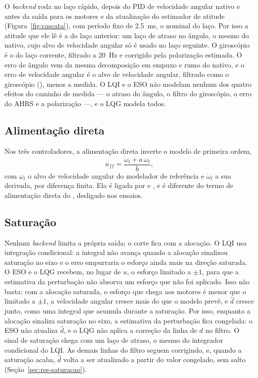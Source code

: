 O \textit{backend} roda no laço rápido,
depois do PID de velocidade angular nativo e antes da saída para os motores e
da atualização do estimador de atitude (Figura~\ref{fig:cascata}), com
período fixo de \SI{2.5}{\milli\second}, o nominal do laço. Por isso a
atitude que ele lê é a do laço anterior: um laço de atraso no ângulo, o mesmo
do nativo, cujo alvo de velocidade angular só é usado no laço seguinte. O
giroscópio é o do laço corrente, filtrado a \SI{20}{\hertz} e corrigido pela
polarização estimada. O erro de ângulo vem da mesma decomposição em empuxo e
rumo do nativo, e o erro de velocidade angular é o alvo de velocidade angular,
filtrado como o giroscópio (), menos a medida. O LQI e o ESO
não modelam nenhum dos quatro efeitos do caminho de medida --- o atraso do
ângulo, o filtro do giroscópio, o erro do AHRS e a polarização ---, e o LQG
modela todos.

\subsection{Alimentação direta}

Nos três controladores, a alimentação direta
inverte o modelo de primeira ordem,
\begin{equation}
u_{ff} = \frac{\dot\omega_t + a\,\omega_t}{b},
\label{eq:ff-modelo}
\end{equation}
com $\omega_t$ o alvo de velocidade angular do modelador de referência e
$\dot\omega_t$ a sua derivada, por diferença finita. Ela é ligada por  e
, e é diferente do termo de alimentação direta do
, desligado nos ensaios.

\subsection{Saturação}

Nenhum \textit{backend} limita a própria saída; o corte
fica com a alocação. O LQI usa integração condicional: a integral não avança
quando a alocação sinalizou saturação no eixo e o erro empurraria o esforço
ainda mais na direção saturada. O ESO e o LQG recebem, no lugar de $u$, o
esforço limitado a $\pm1$, para que a estimativa da perturbação não absorva
um esforço que não foi aplicado. Isso não basta: com a alocação saturada, o
esforço que chega aos motores é menor que o limitado a $\pm1$, a velocidade
angular cresce mais do que o modelo prevê, e $\hat d$ cresce junto, como uma
integral que acumula durante a saturação. Por isso, enquanto a alocação
sinaliza saturação no eixo, a estimativa da perturbação fica congelada: o ESO
não atualiza $\hat d$, e o LQG não aplica a correção da linha de $d$ no
filtro. O sinal de saturação chega com um laço de atraso, o mesmo do
integrador condicional do LQI. As demais linhas do filtro seguem corrigindo,
e, quando a saturação acaba, $\hat d$ volta a ser atualizado a partir do
valor congelado, sem salto (Seção~\ref{sec:res-saturacao}).

